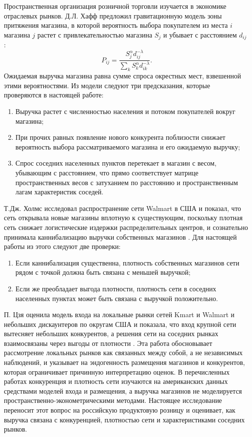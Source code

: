 \documentclass[12pt, a4paper]{article}
\begin{document}
Пространственная организация розничной торговли изучается в экономике отраслевых рынков. Д.Л. Хафф предложил
гравитационную модель зоны притяжения магазина, в которой вероятность выбора покупателем из места
$i$ магазина $j$ растет с привлекательностью магазина $S_j$ и убывает с расстоянием $d_{ij}$
\cite{huff1964}:
\[
P_{ij} = \frac{S_j^{\alpha} d_{ij}^{-\lambda}}{\sum_k S_k^{\alpha} d_{ik}^{-\lambda}}.
\]
\indent Ожидаемая выручка магазина равна сумме спроса окрестных мест, взвешенной этими
вероятностями. Из модели следуют три предсказания, которые проверяются в настоящей работе:

\begin{enumerate}
    \item Выручка растет с численностью населения и потоком покупателей вокруг магазина;
    \item При прочих равных появление нового конкурента поблизости снижает вероятность выбора
    рассматриваемого магазина и его ожидаемую выручку;
    \item Спрос соседних населенных пунктов перетекает в магазин с весом, убывающим с расстоянием,
    что прямо соответствует матрице пространственных весов с затуханием по расстоянию и
    пространственным лагам характеристик соседей.
\end{enumerate}

Т.Дж. Холмс исследовал распространение сети Walmart в США и показал, что сеть открывала новые
магазины вплотную к существующим, поскольку плотная сеть снижает логистические издержки
распределительных центров, и сознательно принимала каннибализацию выручки собственных магазинов
\cite{holmes2011}. Для настоящей работы из этого следуют две проверки:

\begin{enumerate}
    \item Если каннибализация существенна, плотность собственных магазинов сети рядом с точкой
    должна быть связана с меньшей выручкой;
    \item Если же преобладает выгода плотности, плотность сети в соседних населенных пунктах может
    быть связана с выручкой положительно.
\end{enumerate}

П. Цзя оценила модель входа на локальные рынки сетей Kmart и Walmart и небольших дискаунтеров по
округам США и показала, что вход крупной сети вытесняет небольших конкурентов, а решения сети на
соседних рынках взаимосвязаны через выгоды от плотности \cite{jia2008}. Эта работа обосновывает
рассмотрение локальных рынков как связанных между собой, а не независимых наблюдений, и указывает
на эндогенность размещения магазинов и конкурентов, которая ограничивает причинную интерпретацию
оценок. В перечисленных работах конкуренция и плотность сети изучаются на американских данных
средствами моделей входа и размещения, а выручка магазинов не моделируется
пространственно-эконометрическими методами. Настоящее исследование переносит этот вопрос на
российскую продуктовую розницу и оценивает, как выручка связана с конкуренцией, плотностью сети и
характеристиками соседних рынков.
\end{document}
